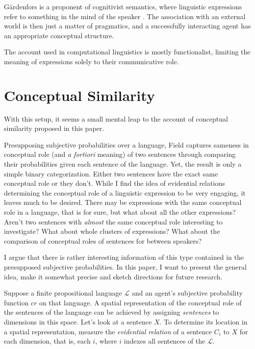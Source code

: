 \documentclass[11pt, a4paper]{article}
\renewcommand{\i}[1]{\emph{#1}}
\begin{document}
Gärdenfors is a proponent of cognitivist semantics, where linguistic expressions refer to something in the mind of the speaker \parencite[154]{gärdenfors2004conceptual}. The association with an external world is then just a matter of pragmatics, and a successfully interacting agent has an appropriate conceptual structure. 

The account used in computational linguistics is mostly functionalist, limiting the meaning of expressions solely to their communicative role. 
\section{Conceptual Similarity}

With this setup, it seems a small mental leap to the account of conceptual similarity proposed in this paper. 

Presupposing subjective probabilities over a language, Field captures sameness in conceptual role (and \i{a fortiori} meaning) of two sentences through comparing their probabilities given each sentence of the language. Yet, the result is only a simple binary categorization. Either two sentences have the exact same conceptual role or they don't. While I find the idea of evidential relations determining the conceptual role of a linguistic expression to be very engaging, it leaves much to be desired. There may be expressions with the same conceptual role in a language, that is for sure, but what about all the other expressions? Aren't two sentences with \i{almost} the same conceptual role interesting to investigate? What about whole clusters of expressions? What about the comparison of conceptual roles of sentences for between speakers?

I argue that there is rather interesting information of this type contained in the presupposed subjective probabilities. In this paper, I want to present the general idea, make it somewhat precise and sketch directions for future research.

Suppose a finite propositional language $\mathcal{L}$ and an agent's subjective probability function $cr$ on that language. A spatial representation of the conceptual role of the sentences of the language can be achieved by assigning \i{sentences} to dimensions in this space. Let's look at a sentence $X$. To determine its location in a spatial representation, measure the \i{evidential relation} of a sentence $C_i$ to $X$ for each dimension, that is, each $i$, where $i$ indexes all sentences of the $\mathcal{L}$. 
\end{document}
